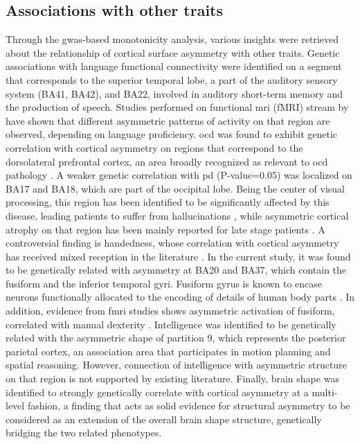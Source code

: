 \subsection{Associations with other traits}
Through the \ac{gwas}-based monotonicity analysis, various insights were retrieved about the relationship of cortical surface asymmetry with other traits. Genetic associations with language functional connectivity  were identified on a segment that corresponds to the superior temporal lobe, a part of the auditory sensory system (BA41, BA42), and BA22, involved in auditory short-term memory and the production of speech. Studies performed on functional \ac{mri} (fMRI) stream by \citet{Hesling2012} have shown that different asymmetric patterns of activity on that region are observed, depending on language proficiency.  \Ac{ocd} was found to exhibit genetic correlation with cortical asymmetry on regions  that correspond to the dorsolateral prefrontal cortex, an area broadly recognized as relevant to \ac{ocd} pathology \cite{Li2020,Han2016}. A weaker genetic correlation with \ac{pd} (P-value=0.05) was localized on BA17 and BA18, which are part of the occipital lobe. Being the center of visual processing, this region has been identified to be significantly affected by this disease, leading patients to suffer from hallucinations \cite{Weil2016}, while asymmetric cortical atrophy on that region has been mainly reported for late stage patients \cite{Claassen2016}. A controversial finding is handedness, whose correlation with cortical asymmetry has received mixed reception in the literature \cite{Sun2006}. In the current study, it was found to be genetically related with asymmetry at BA20 and BA37, which contain the fusiform and the inferior temporal gyri. Fusiform gyrus is known to encase neurons functionally allocated to the encoding of details of human body parts \cite{Peelen2005}. In addition, evidence from f\ac{mri} studies shows asymmetric activation of fusiform, correlated with manual dexterity \cite{Bracci2010}. Intelligence was identified to be genetically related with the asymmetric shape of partition 9, which represents the posterior parietal cortex, an association area that participates in motion planning and spatial reasoning. However, connection of intelligence with asymmetric structure on that region is not supported by existing literature. Finally, brain shape \cite{Naqvi2021} was identified to strongly genetically correlate with cortical asymmetry at a multi-level fashion, a finding that acts as solid evidence  for structural asymmetry to be considered as an extension of the overall brain shape structure, genetically bridging the two related phenotypes.


